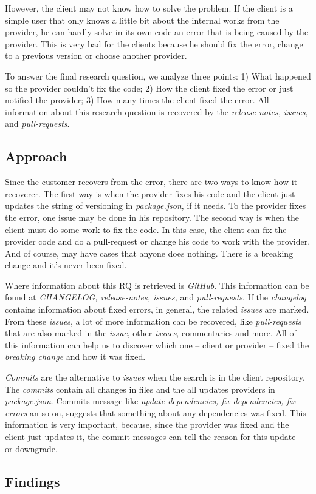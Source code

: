 However, the client may not know how to solve the problem. If the client is a simple user that only knows a little bit about the internal works from the provider, he can hardly solve in its own code an error that is being caused by the provider. This is very bad for the clients because he should fix the error, change to a previous version or choose another provider.

To answer the final research question, we analyze three points: 1) What happened so the provider couldn't fix the code; 2) How the client fixed the error or just notified the provider; 3) How many times the client fixed the error. All information about this research question is recovered by the \textit{release-notes, issues}, and \textit{pull-requests}.

\subsection{Approach}
\label{apr:rq3}

Since the customer recovers from the error, there are two ways to know how it recoverer. The first way is when the provider fixes his code and the client just updates the string of versioning in \textit{package.json}, if it needs. To the provider fixes the error, one issue may be done in his repository. The second way is when the client must do some work to fix the code. In this case, the client can fix the provider code and do a pull-request or change his code to work with the provider. And of course, may have cases that anyone does nothing. There is a breaking change and it’s never been fixed.

Where information about this RQ is retrieved is \textit{GitHub}. This information can be found at \textit{CHANGELOG, release-notes, issues,} and \textit{pull-requests}. If the \textit{changelog} contains information about fixed errors, in general, the related \textit{issues} are marked. From these \textit{issues}, a lot of more information can be recovered, like \textit{pull-requests} that are also marked in the \textit{issue}, other \textit{issues}, commentaries and more. All of this information can help us to discover which one -- client or provider -- fixed the \textit{breaking change} and how it was fixed.

\textit{Commits} are the alternative to \textit{issues} when the search is in the client repository. The \textit{commits} contain all changes in files and the all updates providers in \textit{package.json}. Commits message like \textit{update dependencies, fix dependencies, fix errors} an so on, suggests that something about any dependencies was fixed. This information is very important, because, since the provider was fixed and the client just updates it, the commit messages can tell the reason for this update - or downgrade.

\subsection{Findings}
\label{fin:rq3}